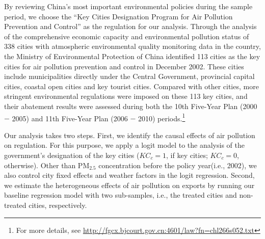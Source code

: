 \documentclass[12pt]{article}
\begin{document}
By reviewing China's most important environmental policies during the sample period, we choose the ``Key Cities Designation Program for Air Pollution Prevention and Control'' as the regulation for our analysis. Through the analysis of the comprehensive economic capacity and environmental pollution status of 338 cities with atmospheric environmental quality monitoring data in the country, the Ministry of Environmental Protection of China identified 113 cities as the key cities for air pollution prevention and control in December 2002. These cities include municipalities directly under the Central Government, provincial capital cities, coastal open cities and key tourist cities.
Compared with other cities, more stringent environmental regulations were imposed on these 113 key cities, and their abatement results were assessed during both the 10th Five-Year Plan (2000 $-$ 2005) and 11th Five-Year Plan (2006 $-$ 2010) periods.\footnote{For more details, see \url{http://fgcx.bjcourt.gov.cn:4601/law?fn=chl266s052.txt}}


Our analysis takes two steps. First, we identify the causal effects of air pollution on regulation. For this purpose, we apply a logit model to the analysis of the government's designation of the key cities ($KC_{c} = 1$, if key cities; $KC_{c}= 0$, otherwise). Other than $\mathrm{PM_{2.5}}$ concentration before the policy year(i.e., 2002), we also control city fixed effects and weather factors in the logit regression. Second, we estimate the heterogeneous effects of air pollution on exports by running our baseline regression model with two sub-samples, i.e., the treated cities and non-treated cities, respectively.
\end{document}
